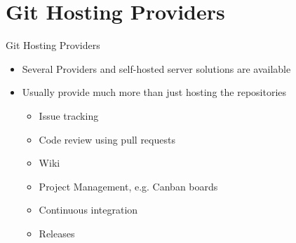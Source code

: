 \section{Git Hosting Providers}

\begin{frame}[c]{Git Hosting Providers}
  \begin{itemize}
    \item Several Providers and self-hosted server solutions are available
    \item Usually provide much more than just hosting the repositories
      \begin{itemize}
        \item Issue tracking
        \item Code review using pull requests
        \item Wiki
        \item Project Management, e.g. Canban boards
        \item Continuous integration
        \item Releases
      \end{itemize}
  \end{itemize}
  
\end{frame}

